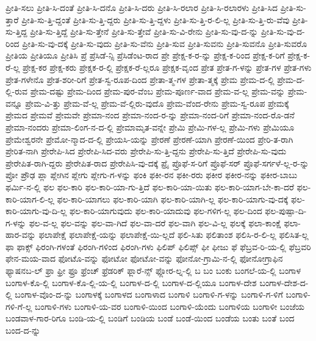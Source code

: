 {ಪ್ರೀತಿ-ಸಲು
ಪ್ರೀತಿ-ಸಿ-ದಂತೆ
ಪ್ರೀತಿ-ಸಿ-ದನೊ
ಪ್ರೀತಿ-ಸಿ-ದರು
ಪ್ರೀತಿ-ಸಿ-ರಲಾರ
ಪ್ರೀತಿ-ಸಿ-ರಲಾರಳು
ಪ್ರೀತಿ-ಸಿದ
ಪ್ರೀತಿ-ಸು-ತ್ತಾರೆ
ಪ್ರೀತಿ-ಸು-ತ್ತಿ-ದ್ದಂತೆ
ಪ್ರೀತಿ-ಸು-ತ್ತಿ-ದ್ದರು
ಪ್ರೀತಿ-ಸು-ತ್ತಿ-ದ್ದಳು
ಪ್ರೀತಿ-ಸು-ತ್ತಿ-ರ-ಲಿ-ಲ್ಲ
ಪ್ರೀತಿ-ಸು-ತ್ತಿ-ರು-ವೆವು
ಪ್ರೀತಿ-ಸು-ತ್ತಿದ್ದ
ಪ್ರೀತಿ-ಸು-ತ್ತಿದ್ದೆ
ಪ್ರೀತಿ-ಸು-ತ್ತೇನೆ
ಪ್ರೀತಿ-ಸು-ತ್ತೇವೆ
ಪ್ರೀತಿ-ಸು-ವಿ-ರೇನು
ಪ್ರೀತಿ-ಸು-ವು-ದ-ನ್ನು
ಪ್ರೀತಿ-ಸು-ವು-ದ-ರಿಂದ
ಪ್ರೀತಿ-ಸು-ವು-ದಕ್ಕೆ
ಪ್ರೀತಿ-ಸು-ವುದು
ಪ್ರೀತಿ-ಸು-ವೆನು
ಪ್ರೀತಿ-ಸುವ
ಪ್ರೀತಿ-ಸುವನು
ಪ್ರೀತಿ-ಸುವನೊ
ಪ್ರೀತಿ-ಸುವರೊ
ಪ್ರೀತಿಯ
ಪ್ರೀತಿಯೂ
ಪ್ರೀತಿಸಿ
ಪ್ರೆ
ಪ್ರೆಸಿಡೆ-ನ್ಸಿ
ಪ್ರೆಸಿಡೆಂಟ-ರಾದ
ಪ್ರೇ
ಪ್ರೇಕ್ಷ-ಕ-ರ-ನ್ನು
ಪ್ರೇಕ್ಷ-ಕ-ರಿಂದ
ಪ್ರೇಕ್ಷ-ಕ-ರಿಗೆ
ಪ್ರೇಕ್ಷ-ಕ-ರೆ-ಲ್ಲ
ಪ್ರೇಕ್ಷ-ಕರ
ಪ್ರೇಕ್ಷ-ಕರು
ಪ್ರೇಕ್ಷಕ-ರ-ಲ್ಲಿ
ಪ್ರೇಕ್ಷಕ-ರೆ-ಲ್ಲರೂ
ಪ್ರೇಕ್ಷಕ-ವೃಂದ
ಪ್ರೇತ
ಪ್ರೇತ-ಗ-ಳನ್ನು
ಪ್ರೇತ-ಗಳ
ಪ್ರೇತ-ಗಳು
ಪ್ರೇತ-ಗಳೇನೊ
ಪ್ರೇತ-ಶರೀ-ರಿಗೆ
ಪ್ರೇತ-ಸ್ವ-ರೂಪ-ದಿಂದ
ಪ್ರೇತಾ-ತ್ಮ-ಗಳ
ಪ್ರೇತಾ-ತ್ಮಕ್ಕೆ
ಪ್ರೇಮ
ಪ್ರೇಮ-ದ-ಲ್ಲಿ
ಪ್ರೇಮ-ದ-ಲ್ಲಿ-ರುವ
ಪ್ರೇಮ-ದಷ್ಟು
ಪ್ರೇಮ-ದಿಂದ
ಪ್ರೇಮ-ಪುರ-ವೆಂಬ
ಪ್ರೇಮ-ಪೂರ್ಣ-ವಾದ
ಪ್ರೇಮ-ವ-ಲ್ಲ
ಪ್ರೇಮ-ವನ್ನು
ಪ್ರೇಮ-ವನ್ನೂ
ಪ್ರೇಮ-ವಿ-ತ್ತು
ಪ್ರೇಮ-ವೆ-ಲ್ಲ
ಪ್ರೇಮ-ವೆ-ಲ್ಲಿರು-ವುದೊ
ಪ್ರೇಮ-ವೆಂದ-ರೇನು
ಪ್ರೇಮ-ಸ್ವ-ರೂಪ
ಪ್ರೇಮಕ್ಕೆ
ಪ್ರೇಮದ
ಪ್ರೇಮವೆ
ಪ್ರೇಮವೇ
ಪ್ರೇಮಾ-ನಂದ
ಪ್ರೇಮಾ-ನಂದ-ರ-ನ್ನು
ಪ್ರೇಮಾ-ನಂದ-ರಿಗೆ
ಪ್ರೇಮಾ-ನಂದ-ರೊ-ಡನೆ
ಪ್ರೇಮಾ-ನಂದರು
ಪ್ರೇಮಾ-ಲಿಂಗ-ನ-ದ-ಲ್ಲಿ
ಪ್ರೇಮಾಮೃತ-ವನ್ನೇ
ಪ್ರೇಮಿ
ಪ್ರೇಮಿ-ಗಳ-ಲ್ಲ
ಪ್ರೇಮಿ-ಗಳು
ಪ್ರೇಮಿಯೂ
ಪ್ರೇಮೇಶ್ವರನೇ
ಪ್ರೇಮೋ-ನ್ಮಾದ-ದ-ಲ್ಲಿ
ಪ್ರೇಯಸಿ-ಯನ್ನು
ಪ್ರೇರಣೆ
ಪ್ರೇರಣೆ-ಯಾಗಿ
ಪ್ರೇರಣೆ-ಯಿಂದ
ಪ್ರೇರಿ-ತ-ರಾಗಿ
ಪ್ರೇರಿತ-ನಾಗಿ
ಪ್ರೇರೇಪಿ-ಸಿದ
ಪ್ರೇರೇಪಿ-ಸಿದ-ವರು
ಪ್ರೇರೇಪಿ-ಸು-ತ್ತಿ-ದ್ದನು
ಪ್ರೇರೇಪಿ-ಸು-ತ್ತಿದೆ
ಪ್ರೇರೇಪಿ-ಸು-ವುದು
ಪ್ರೇರೇಪಿತ-ರಾಗಿ-ದ್ದರು
ಪ್ರೇರೇಪಿತ-ರಾದ
ಪ್ರೇರೇಪಿಸಿ-ವು-ದಕ್ಕೆ
ಪ್ರೈ
ಪ್ರೊಫೆ-ಸ-ರಿಗೆ
ಪ್ರೊಫೆ-ಸರ್
ಪ್ರೊಫೆ-ಸರ್ಗಳೆ-ಲ್ಲ-ರ-ನ್ನು
ಪ್ರೋ
ಪ್ರೌಢ
ಪ್ಲಾ
ಪ್ಲೇಗಿನ
ಪ್ಲೇಗು
ಪ್ಲೇಗು-ಗ-ಳನ್ನು
ಫಂಕಿ
ಫಕೀ-ರನ
ಫಕೀ-ರರು
ಫಕೀರ
ಫಕೀರ-ನನ್ನು
ಫಕೀರ-ಬಾಬು
ಫರ್ಮಿ-ನ-ಲ್ಲಿ
ಫಲ
ಫಲ-ಕಾರಿ
ಫಲ-ಕಾರಿ-ಯಾ-ಗು-ತ್ತಿದೆ
ಫಲ-ಕಾರಿ-ಯಾ-ಯಿತು
ಫಲ-ಕಾರಿ-ಯಾಗ-ಬೇ-ಕಾ-ದರೆ
ಫಲ-ಕಾರಿ-ಯಾಗ-ಲಿ-ಲ್ಲ
ಫಲ-ಕಾರಿ-ಯಾಗಲು
ಫಲ-ಕಾರಿ-ಯಾಗಿ
ಫಲ-ಕಾರಿ-ಯಾಗಿ-ಲ್ಲ
ಫಲ-ಕಾರಿ-ಯಾಗು-ವು-ದಕ್ಕೆ
ಫಲ-ಕಾರಿ-ಯಾಗು-ವು-ದಿ-ಲ್ಲ
ಫಲ-ಕಾರಿ-ಯಾಗುವುದು
ಫಲ-ಕಾರಿ-ಯಾದುವು
ಫಲ-ಗಳಿಗ-ಲ್ಲ
ಫಲ-ದಿಂದ
ಫಲ-ಪುಷ್ಪಾ-ದಿ-ಗ-ಳನ್ನು
ಫಲ-ವ-ಲ್ಲ
ಫಲ-ವನ್ನು
ಫಲ-ವಾ-ಗಿದೆ
ಫಲ-ವಾ-ದರೆ
ಫಲ-ವಾಗಿ
ಫಲ-ವಿ-ಲ್ಲ
ಫಲಕ್ಕೆ
ಫಲಾ-ಕಾಂಕ್ಷೆ
ಫಲಾ-ಹಾರ-ವನ್ನು
ಫಲಾಪೇಕ್ಷೆ
ಫಲಾಪೇಕ್ಷೆ-ಯನ್ನು
ಫಲಾಪೇಕ್ಷೆ-ಯಿ-ಲ್ಲದೆ
ಫಲಿ-ಸಿತು
ಫಲಿತಾಂಶ
ಫಲಿಸಿ-ರ-ಲಿ-ಲ್ಲ
ಫಲಿಸಿತ-ಲ್ಲ
ಫಾ
ಫಾಕ್ಸ್
ಫಿರಂಗಿ-ಗಳಂತೆ
ಫಿರಂಗಿ-ಗಳಿಂದ
ಫಿರಂಗಿ-ಗಳು
ಫಿಲಿಪ್
ಫಿಲಿಪ್ಸ್
ಫೀ
ಫೀಜು
ಫೆ
ಫೆಬ್ರವ-ರಿ-ಯ-ಲ್ಲಿ
ಫೆಬ್ರವರಿ
ಫೇನ-ಮಯ-ವಾದ
ಫೋಟೊ-ವನ್ನು
ಫೋಟೋ
ಫೋಟೋ-ವನ್ನು
ಫೋನೋ-ಗ್ರಾಮಿ-ನ-ಲ್ಲಿ
ಫೋನೋಗ್ರಾಫಿನ
ಫ್ಯಾಷನಬ-ಲ್
ಫ್ರಾ
ಫ್ರೀ
ಫ್ರೂ
ಫ್ರೆಂಚ್
ಫ್ರೆಡರಿಕ್
ಫ್ಲಾರೆ-ನ್ಸ್
ಫ್ಲೋರ-ಲ್ನ-ಲ್ಲಿ
ಬ
ಬಂ
ಬಂಕು
ಬಂಗಲೆ-ಯ-ಲ್ಲಿ
ಬಂಗಾಳ
ಬಂಗಾಳ-ಕೊ-ಲ್ಲಿ
ಬಂಗಾಳ-ಕೊ-ಲ್ಲಿ-ಯ-ಲ್ಲಿ
ಬಂಗಾಳ-ದ-ಲ್ಲಿ
ಬಂಗಾಳ-ದ-ಲ್ಲಿಯೂ
ಬಂಗಾಳ-ದೇಶ
ಬಂಗಾಳ-ದೇಶ-ದ-ಲ್ಲಿ
ಬಂಗಾಳ-ವೊಂ-ದ-ನ್ನು
ಬಂಗಾಳಕ್ಕೆ
ಬಂಗಾಳದ
ಬಂಗಾಳಾದ
ಬಂಗಾಳಿ
ಬಂಗಾಳಿ-ಗ-ಳನ್ನು
ಬಂಗಾಳಿ-ಗ-ಳಿಗೆ
ಬಂಗಾಳಿ-ಗಳಿ-ಗೆ-ಲ್ಲ
ಬಂಗಾಳಿ-ಗಳು
ಬಂಗಾಳಿ-ಯ-ವರ
ಬಂಗಾಳಿ-ಯಿಂದ
ಬಂಗಾಳಿ-ಯೆಂದು
ಬಂಗಾಳಿಯ
ಬಂಗಾಳೀ
ಬಂಜೆಯ
ಬಂಡವಾಳ-ಗಾರ-ರಿಗೂ
ಬಂಡಿ-ಯ-ಲ್ಲಿ
ಬಂಡಿಗೆ
ಬಂಡಿಯ
ಬಂಡೆ
ಬಂಡೆ-ಯಿಂದ
ಬಂಡೆಯ
ಬಂತು
ಬಂತೆ
ಬಂದ
ಬಂದ-ದ-ನ್ನು
}

